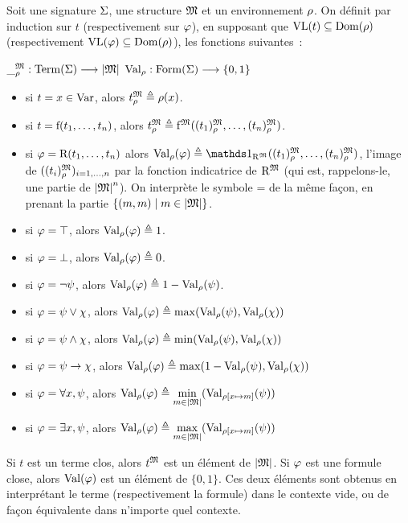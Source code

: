 \begin{definition}
  Soit une signature $\Sigma$, une structure $\mathfrak{M}$ et un environnement
  $\rho$. On définit par induction sur $t$ (respectivement sur $\varphi$), en
  supposant que $\operatorname{VL}(t)\subseteq\operatorname{Dom}(\rho)$ (respectivement
  $\operatorname{VL}(\varphi)\subseteq\operatorname{Dom}(\rho)$), les fonctions suivantes~:
  \begin{center}
    $\mathord{\_}^{\mathfrak{M}}_{\rho} : \displaystyle \operatorname{Term}(\Sigma) \longrightarrow \left\vert \mathfrak{M}\right\vert$
    \qquad
    $\operatorname{Val}_{\rho} : \displaystyle \operatorname{Form}(\Sigma) \longrightarrow \{0,1\}$
  \end{center}

  \begin{itemize}
  \item si $t = x \in \operatorname{Var}$, alors $t^{\mathfrak{M}}_{\rho} \triangleq \rho(x)$.
  \item si $t = \mathrm{f}(t_1,\ldots,t_n)$, alors
    $t^{\mathfrak{M}}_{\rho} \triangleq \mathrm{f}^{\mathfrak{M}}((t_1)^{\mathfrak{M}}_{\rho},\ldots,(t_n)^{\mathfrak{M}}_{\rho})$.
  \item si $\varphi = \mathrm{R}(t_1,\ldots,t_n)$ alors
    $\ValE(\varFF) \defeq \indicP{\toM{\symbR}}
    (\toMMI{(t_1)},\ldots,\toMMI{(t_n)})$,
    l'image
    de $((t_i)^{\mathfrak{M}}_{\rho})_{i = 1,\ldots,n}$ par la fonction indicatrice de
    $\mathrm{R}^{\mathfrak{M}}$ (qui est, rappelons-le, une partie de $\left\vert \mathfrak{M}\right\vert^n$).
    On interprète le symbole $\mathord{=}$ de la même façon, en prenant la
    partie $\left\{ (m,m) \;\middle\vert\; m\in \left\vert \mathfrak{M}\right\vert \right\}$.
  \item si $\varphi = \top$, alors $\operatorname{Val}_{\rho}(\varphi) \triangleq 1$.
  \item si $\varphi = \bot$, alors $\operatorname{Val}_{\rho}(\varphi) \triangleq 0$.
  \item si $\varphi = \lnot \psi$, alors
    $\operatorname{Val}_{\rho}(\varphi) \triangleq 1 - \operatorname{Val}_{\rho}(\psi)$.
  \item si $\varphi = \psi \lor \chi$, alors
    $\operatorname{Val}_{\rho}(\varphi) \triangleq \max(\operatorname{Val}_{\rho}(\psi),\operatorname{Val}_{\rho}(\chi))$
  \item si $\varphi = \psi \land \chi$, alors
    $\operatorname{Val}_{\rho}(\varphi) \triangleq \min(\operatorname{Val}_{\rho}(\psi),\operatorname{Val}_{\rho}(\chi))$
  \item si $\varphi = \psi \to \chi$, alors
    $\operatorname{Val}_{\rho}(\varphi) \triangleq \max(1 - \operatorname{Val}_{\rho}(\psi),\operatorname{Val}_{\rho}(\chi))$
  \item si $\varphi = \forall x, \psi$, alors
    $\displaystyle\operatorname{Val}_{\rho}(\varphi) \triangleq
    \min_{m \in \left\vert \mathfrak{M}\right\vert}(\operatorname{Val}_{\rho[x\mapsto m]}(\psi))$
  \item si $\varphi = \exists x, \psi$, alors
    $\displaystyle\operatorname{Val}_{\rho}(\varphi) \triangleq
    \max_{m \in \left\vert \mathfrak{M}\right\vert}(\operatorname{Val}_{\rho[x\mapsto m]}(\psi))$
  \end{itemize}
  
  Si $t$ est un terme clos, alors $t^{\mathfrak{M}}$ est un élément de
  $\left\vert \mathfrak{M}\right\vert$. Si $\varphi$ est une formule close, alors $\operatorname{Val}(\varphi)$ est
  un élément de $\{0,1\}$. Ces deux éléments sont obtenus en interprétant le
  terme (respectivement la formule) dans le contexte vide, ou de façon
  équivalente dans n'importe quel contexte.
\end{definition}

